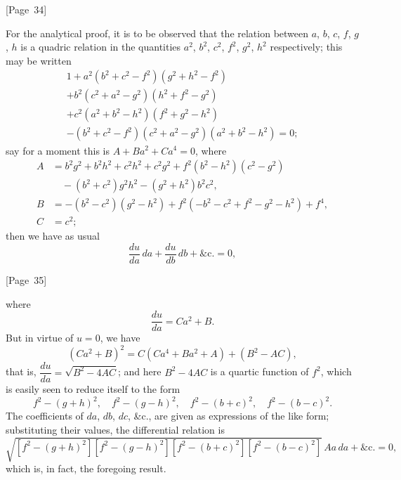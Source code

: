 \documentclass[11pt,a4paper]{article}
\theoremstyle{plain}
\theoremstyle{definition}
\theoremstyle{remark}
\begin{document}
\begin{center}
[Page~34]
\end{center}

For the analytical proof, it is to be observed that the relation
between $a$, $b$, $c$, $f$, $g$, $h$ is a quadric relation in the
quantities $a^2$, $b^2$, $c^2$, $f^2$, $g^2$, $h^2$ respectively;
this may be written
\begin{multline*}
1 + a^2(b^2 + c^2 - f^2)(g^2 + h^2 - f^2) \\
+ b^2(c^2 + a^2 - g^2)(h^2 + f^2 - g^2) \\
+ c^2(a^2 + b^2 - h^2)(f^2 + g^2 - h^2) \\
- (b^2 + c^2 - f^2)(c^2 + a^2 - g^2)(a^2 + b^2 - h^2) = 0;
\end{multline*}
say for a moment this is $A + Ba^2 + Ca^4 = 0$, where
\begin{align*}
A &= b^2g^2 + b^2h^2 + c^2h^2 + c^2g^2 + f^2(b^2 - h^2)(c^2 - g^2) \\
  &\quad - (b^2 + c^2)g^2h^2 - (g^2 + h^2)b^2c^2, \\
B &= -(b^2 - c^2)(g^2 - h^2) + f^2(-b^2 - c^2 + f^2 - g^2 - h^2) + f^4, \\
C &= c^2;
\end{align*}
then we have as usual
\[
\frac{du}{da}\,da + \frac{du}{db}\,db + \&\text{c.} = 0,
\]

\begin{center}
[Page~35]
\end{center}

where
\[
\frac{du}{da} = Ca^2 + B.
\]
But in virtue of $u = 0$, we have
\[
(Ca^2 + B)^2 = C(Ca^4 + Ba^2 + A) + (B^2 - AC),
\]
that is, $\dfrac{du}{da} = \sqrt{B^2 - 4AC}$;
and here $B^2 - 4AC$ is a quartic function of $f^2$, which is easily seen
to reduce itself to the form
\[
f^2 - (g+h)^2, \quad f^2 - (g-h)^2, \quad f^2 - (b+c)^2, \quad f^2 - (b-c)^2.
\]
The coefficients of $da$, $db$, $dc$, \&c., are given as expressions of
the like form; substituting their values, the differential relation is
\[
\sqrt{[f^2 - (g+h)^2][f^2 - (g-h)^2][f^2 - (b+c)^2][f^2 - (b-c)^2]}\, Aa\,da
+ \&\text{c.} = 0,
\]
which is, in fact, the foregoing result.
\end{document}
